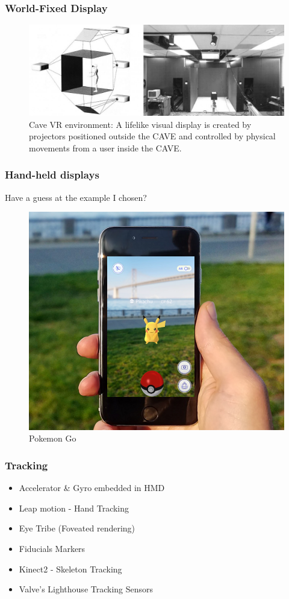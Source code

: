 \begin{frame}
	\frametitle{World-Fixed Display}
	\begin{figure}
		\includegraphics[scale=0.3]{assets/cave.jpg}
		\caption{Cave VR environment: A lifelike visual display is created by projectors positioned outside the CAVE and controlled by physical movements from a user inside the CAVE.}
	\end{figure}
\end{frame}

\begin{frame}
	\frametitle{Hand-held displays}
	Have a guess at the example I chosen?
	\pause
	\begin{figure}
		\includegraphics[scale=0.25]{assets/pgo.png}
		\caption{Pokemon Go}
	\end{figure}
	
\end{frame}

\begin{frame}
	\frametitle{Tracking}
	\begin{itemize}
		\item Accelerator \& Gyro embedded in HMD
		\item Leap motion - Hand Tracking
		\item Eye Tribe (Foveated rendering)
		\item Fiducials Markers
		\item Kinect2 - Skeleton Tracking
		\item Valve's Lighthouse Tracking Sensors
	\end{itemize}
\end{frame}

